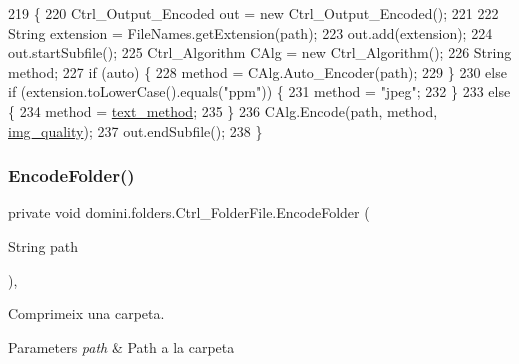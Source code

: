 \begin{DoxyCode}
219                                          \{
220         Ctrl\_Output\_Encoded out = \textcolor{keyword}{new} Ctrl\_Output\_Encoded();
221 
222         String extension = FileNames.getExtension(path);
223         out.add(extension);
224         out.startSubfile();
225         Ctrl\_Algorithm CAlg = \textcolor{keyword}{new} Ctrl\_Algorithm();
226         String method;
227         \textcolor{keywordflow}{if} (\textcolor{keyword}{auto}) \{
228             method = CAlg.Auto\_Encoder(path);
229         \}
230         \textcolor{keywordflow}{else} \textcolor{keywordflow}{if} (extension.toLowerCase().equals(\textcolor{stringliteral}{"ppm"})) \{
231             method = \textcolor{stringliteral}{"jpeg"};
232         \}
233         \textcolor{keywordflow}{else} \{
234             method = \hyperlink{classdomini_1_1folders_1_1Ctrl__FolderFile_a75ef571be454360b835f552d2cf20741}{text\_method};
235         \}
236         CAlg.Encode(path, method, \hyperlink{classdomini_1_1folders_1_1Ctrl__FolderFile_a7990a74c394d53a58ebbf4a7872c700d}{img\_quality});
237         out.endSubfile();
238     \}
\end{DoxyCode}
\mbox{\label{classdomini_1_1folders_1_1Ctrl__FolderFile_a6b18175639009f0186307710fb88a18f}} 
\subsubsection{\texorpdfstring{Encode\+Folder()}{EncodeFolder()}}
{\footnotesize\ttfamily private void domini.\+folders.\+Ctrl\+\_\+\+Folder\+File.\+Encode\+Folder (\begin{DoxyParamCaption}\item[{String}]{path }\end{DoxyParamCaption})\hspace{0.3cm}{\ttfamily [inline]}, {\ttfamily [private]}}



Comprimeix una carpeta. 


\begin{DoxyParams}{Parameters}
{\em path} & Path a la carpeta \\
\hline
\end{DoxyParams}

